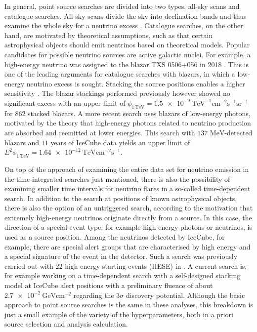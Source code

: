 In general, point source searches are divided into two types, all-sky scans and catalogue searches.
All-sky scans divide the sky into declination bands and thus examine the whole sky for a neutrino excess \cite{all_sky_paper}.
Catalogue searches, on the other hand, are motivated by theoretical assumptions, such as that certain astrophysical objects should emit neutrinos based on theoretical models.
Popular candidates for possible neutrino sources are active galactic nuclei.
For example, a high-energy neutrino was assigned to the blazar TXS 0506+056 in 2018 \cite{txs}.
This is one of the leading arguments for catalogue searches with blazars, in which a low-energy neutrino excess is sought.
Stacking the source positions enables a higher sensitivity \cite{stacking_argument}.
The blazar stackings performed previously however \cite{blazar_stacking_2017} showed no significant excess with an upper limit of $\phi_{\SI{1}{\tera\electronvolt}}=\SI{1.5e-9}{\tera\electronvolt\tothe{-1}\centi\meter\tothe{-2}\second\tothe{-1}\steradian\tothe{-1}}$ for $\num{862}$ stacked blazars.
A more recent search \cite{blazar_stacking_2020} uses blazars of low-energy photons, motivated by the theory that high-energy photons related to neutrino production are absorbed and reemitted at lower energies.
This search with $\num{137}$ $\si{\mega\electronvolt}$-detected blazars and $\num{11}$ years of IceCube data yields an upper limit of $E^2\phi_{\SI{1}{\tera\electronvolt}}=\SI{1.64e-12}{\tera\electronvolt\centi\meter\tothe{-2}\second\tothe{-1}}$.

On top of the approach of examining the entire data set for neutrino emission in the time-integrated searches just mentioned, there is also the possibility of examining smaller time intervals for neutrino flares in a so-called time-dependent search.
In addition to the search at positions of known astrophysical objects, there is also the option of an untriggered search, according to the motivation that extremely high-energy neutrinos originate directly from a source.
In this case, the direction of a special event type, for example high-energy photons or neutrinos, is used as a source position.
Among the neutrinos detected by IceCube, for example, there are special alert groups that are characterised by high energy and a special signature of the event in the detector.
Such a search was previously carried out with $\num{22}$ high energy starting events (HESE) in \cite{thorben}.
A current search is, for example \cite{martina} working on a time-dependent search with a self-designed stacking model at IceCube alert positions with a preliminary fluence of about $\SI{2.7e-2}{\giga\electronvolt\centi\meter\tothe{-2}}$ regarding the $\num{3}\sigma$ discovery potential.
Although the basic approach to point source searches is the same in these analyses, this breakdown is just a small example of the variety of the hyperparameters, both in a priori source selection and analysis calculation.

